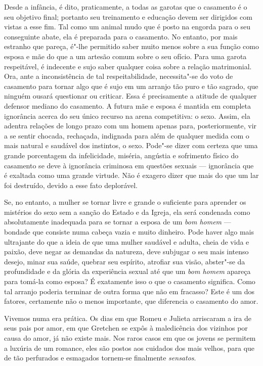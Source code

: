 Desde a infância, é dito, praticamente, a todas as garotas que o
casamento é o seu objetivo final; portanto seu treinamento e educação
devem ser dirigidos com vistas a esse fim. Tal como um animal mudo que é
posto na engorda para o seu conseguinte abate, ela é preparada para o
casamento. No entanto, por mais estranho que pareça, é"-lhe permitido
saber muito menos sobre a sua função como esposa e mãe do que a um
artesão comum sobre o seu ofício. Para uma garota respeitável, é\label{artesao}
indecente e sujo saber qualquer coisa sobre a relação matrimonial. Ora,
ante a inconsistência de tal respeitabilidade, necessita"-se do voto
de casamento para tornar algo que é sujo em um arranjo tão puro e tão
sagrado, que ninguém ousará questionar ou criticar.
Essa é precisamente a atitude de qualquer defensor mediano do
casamento. A futura mãe e esposa é mantida em completa ignorância acerca do seu
único recurso na arena competitiva: o sexo. Assim, ela adentra relações
de longo prazo com um homem apenas para, posteriormente, vir a se sentir
chocada, rechaçada, indignada para além de qualquer medida com o mais
natural e saudável dos instintos, o sexo. Pode"-se dizer com certeza que
uma grande porcentagem da infelicidade, miséria, angústia e sofrimento
físico do casamento se deve à ignorância criminosa em questões sexuais
--- ignorância que é exaltada como uma grande virtude. Não é exagero
dizer que mais do que um lar foi destruído, devido a esse fato
deplorável.

Se, no entanto, a mulher se tornar livre e grande o suficiente para
aprender os mistérios do sexo sem a sanção do Estado e da Igreja, ela
será condenada como absolutamente inadequada para se tornar a esposa de
um \textit{bom homem} --- bondade que consiste numa cabeça vazia e muito
dinheiro. Pode haver algo mais ultrajante do que a ideia de que uma
mulher saudável e adulta, cheia de vida e paixão, deve negar as demandas
da natureza, deve subjugar o seu mais intenso desejo, minar sua saúde,
quebrar seu espírito, atrofiar sua visão, abster"-se da profundidade
e da glória da experiência sexual até que um \textit{bom homem} apareça
para tomá-la como esposa? É exatamente isso o que o casamento significa.
Como tal arranjo poderia terminar de outra forma que não em fracasso?
Este é um dos fatores, certamente não o menos importante, que
diferencia o casamento do amor.

Vivemos numa era prática. Os dias em que Romeu e Julieta arriscaram a
ira de seus pais por amor, em que Gretchen se expôs à maledicência dos
vizinhos por causa do amor, já não existe mais. Nos raros casos em que
os jovens se permitem a luxúria de um romance, eles são postos aos cuidados dos mais velhos, para que de tão perfurados e esmagados tornem-se finalmente \textit{sensatos}.

